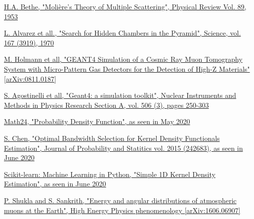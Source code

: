 \documentclass[a4paper, 11pt]{report}
\begin{document}
\begin{thebibliography}{1}
\href{https://journals.aps.org/pr/abstract/10.1103/PhysRev.89.1256}{H.A. Bethe,
"Moli\`ere's Theory of Multiple Scattering", 
Physical Review Vol. 89, 1953}

\href{https://ui.adsabs.harvard.edu/abs/1970Sci...167..832A/abstract}{L. Alvarez et all.,
"Search for Hidden Chambers in the Pyramid", 
Science, vol. 167 (3919), 1970}

\href{https://arxiv.org/pdf/0811.0187.pdf}{M. Holmann et all, "GEANT4 Simulation of a Cosmic Ray Muon Tomography System with Micro-Pattern Gas Detectors for the Detection of High-Z Materials" [arXiv:0811.0187]}

\href{https://www.sciencedirect.com/science/article/pii/S0168900203013688}{S. Agostinelli et all, "Geant4: a simulation toolkit", Nuclear Instruments and Methods in Physics Research Section A, vol. 506 (3), pages 250-303}

\href{https://www.math24.net/probability-density-function/}{Math24, "Probability Density Function", as seen in May 2020}

\href{https://www.hindawi.com/journals/jps/2015/242683/}{S. Chen, "Optimal Bandwidth Selection for Kernel Density Functionals Estimation", Journal of Probability and Statitics vol. 2015 (242683), as seen in June 2020}

\href{https://scikit-learn.org/stable/auto_examples/neighbors/plot_kde_1d.html}{Scikit-learn: Machine Learning in {P}ython, "Simple 1D Kernel Density Estimation", as seen in June 2020}

\href{https://arxiv.org/abs/1606.06907}{P. Shukla and S. Sankrith, "Energy and angular distributions of atmospheric muons at the Earth", High Energy Physics phenomenology [arXiv:1606.06907]}

\end{thebibliography}
\end{document}
